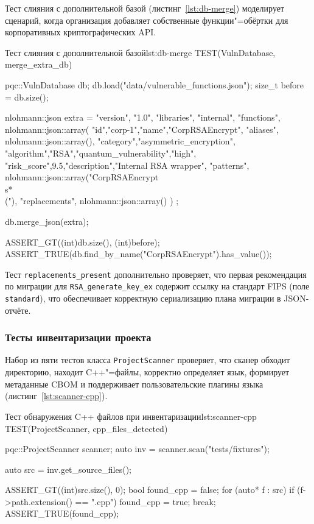 Тест слияния с дополнительной базой (листинг~\ref{lst:db-merge})
моделирует сценарий, когда организация добавляет собственные
функции"=обёртки для корпоративных криптографических API.

\begin{itmolisting}[C++]{Тест слияния с дополнительной базой}{lst:db-merge}
TEST(VulnDatabase, merge_extra_db) {
    pqc::VulnDatabase db;
    db.load("data/vulnerable_functions.json");
    size_t before = db.size();

    nlohmann::json extra = {
      {"version", "1.0"},
      {"libraries", {{"internal", {{"functions", nlohmann::json::array({
        {{"id","corp-1"},{"name","CorpRSAEncrypt"},
         {"aliases", nlohmann::json::array()},
         {"category","asymmetric_encryption"},
         {"algorithm","RSA"},{"quantum_vulnerability","high"},
         {"risk_score",9.5},{"description","Internal RSA wrapper"},
         {"patterns", nlohmann::json::array({"CorpRSAEncrypt\\s*\\("})},
         {"replacements", nlohmann::json::array()}}
      })}}}}}
    };

    db.merge_json(extra);

    ASSERT_GT((int)db.size(), (int)before);
    ASSERT_TRUE(db.find_by_name("CorpRSAEncrypt").has_value());
}
\end{itmolisting}

Тест \texttt{replacements\_present} дополнительно проверяет, что первая
рекомендация по миграции для \texttt{RSA\_generate\_key\_ex} содержит
ссылку на стандарт FIPS (поле \texttt{standard}), что обеспечивает
корректную сериализацию плана миграции в JSON-отчёте.

\subsubsection{Тесты инвентаризации проекта}

Набор из пяти тестов класса \texttt{ProjectScanner} проверяет, что сканер
обходит директорию, находит C++"=файлы, корректно определяет язык,
формирует метаданные CBOM и поддерживает пользовательские плагины
языка (листинг~\ref{lst:scanner-cpp}).

\begin{itmolisting}[C++]{Тест обнаружения C++ файлов при инвентаризации}{lst:scanner-cpp}
TEST(ProjectScanner, cpp_files_detected) {
    pqc::ProjectScanner scanner;
    auto inv = scanner.scan("tests/fixtures");

    auto src = inv.get_source_files();

    ASSERT_GT((int)src.size(), 0);
    bool found_cpp = false;
    for (auto* f : src)
        if (f->path.extension() == ".cpp") { found_cpp = true; break; }
    ASSERT_TRUE(found_cpp);
}
\end{itmolisting}

